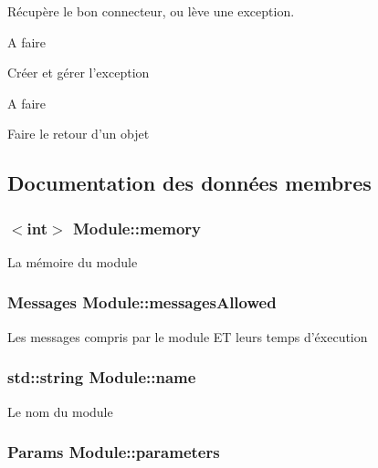Récupère le bon connecteur, ou lève une exception. 

\begin{DoxyRefDesc}{A faire}
\item[\hyperlink{todo__todo000001}{A faire}]Créer et gérer l'exception \end{DoxyRefDesc}
\begin{DoxyRefDesc}{A faire}
\item[\hyperlink{todo__todo000004}{A faire}]Faire le retour d'un objet \end{DoxyRefDesc}


\subsection{Documentation des données membres}
\hypertarget{classModule_a48fa02fe55d33daffff725c615a63bb9}{
\subsubsection[{memory}]{$<$int$>$ Module\-::memory\hspace{0.3cm}{\ttfamily [protected]}}}\label{classModule_a48fa02fe55d33daffff725c615a63bb9}
La mémoire du module \hypertarget{classModule_aaadd1f971bebf7bb5eae12fcc5689198}{
\subsubsection[{messages\-Allowed}]{\setlength{\rightskip}{0pt plus 5cm}Messages Module\-::messages\-Allowed\hspace{0.3cm}{\ttfamily [protected]}}}\label{classModule_aaadd1f971bebf7bb5eae12fcc5689198}
Les messages compris par le module E\-T leurs temps d'éxecution \hypertarget{classModule_a794fbb44972c7c73cc197159093e66d1}{
\subsubsection[{name}]{\setlength{\rightskip}{0pt plus 5cm}std\-::string Module\-::name\hspace{0.3cm}{\ttfamily [protected]}}}\label{classModule_a794fbb44972c7c73cc197159093e66d1}
Le nom du module \hypertarget{classModule_a232443111a9d59c17724992ddf75fbad}{
\subsubsection[{parameters}]{\setlength{\rightskip}{0pt plus 5cm}Params Module\-::parameters\hspace{0.3cm}{\ttfamily [protected]}}}\label{classModule_a232443111a9d59c17724992ddf75fbad}
